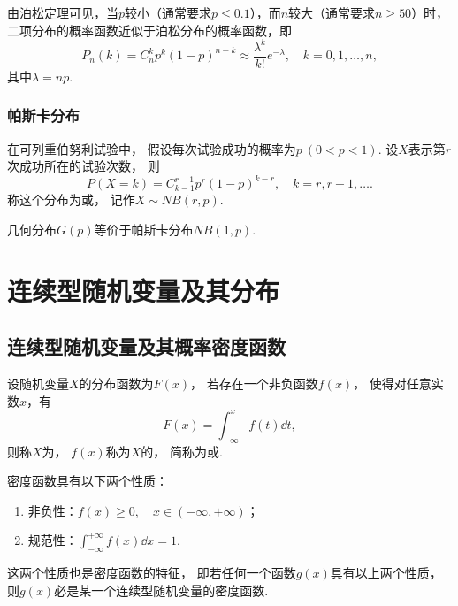 由泊松定理可见，当\(p\)较小（通常要求\(p \leq 0.1\)），而\(n\)较大（通常要求\(n \geq 50\)）时，
二项分布的概率函数近似于泊松分布的概率函数，即\[
	P_n(k) = C_n^k p^k (1-p)^{n-k}
	\approx \frac{\lambda^k}{k!} e^{-\lambda},
	\quad k=0,1,\dotsc,n,
\]
其中\(\lambda = n p\).

\subsubsection{帕斯卡分布}
\begin{definition}
在可列重伯努利试验中，
假设每次试验成功的概率为\(p\ (0<p<1)\).
设\(X\)表示第\(r\)次成功所在的试验次数，
则\begin{equation}
P(X=k) = C_{k-1}^{r-1} p^r (1-p)^{k-r},
\quad k=r,r+1,\dotsc.
\end{equation}
称这个分布为或，
记作\(X \sim NB(r, p)\).
\end{definition}

几何分布\(G(p)\)等价于帕斯卡分布\(NB(1,p)\).

\section{连续型随机变量及其分布}
\subsection{连续型随机变量及其概率密度函数}
\begin{definition}
设随机变量\(X\)的分布函数为\(F(x)\)，
若存在一个非负函数\(f(x)\)，
使得对任意实数\(x\)，有\[
	F(x) = \int_{-\infty}^x f(t) \dd{t},
\]
则称\(X\)为，
\(f(x)\)称为\(X\)的，
简称为或.
\end{definition}

\begin{property}\label{theorem:随机变量及其分布.连续型随机变量的密度函数的性质}
密度函数具有以下两个性质：
\begin{enumerate}
	\item 非负性：\(f(x) \geq 0, \quad x \in (-\infty,+\infty)\)；
	\item 规范性：\(\int_{-\infty}^{+\infty} f(x) \dd{x} = 1\).
\end{enumerate}
\end{property}
这两个性质也是密度函数的特征，
即若任何一个函数\(g(x)\)具有以上两个性质，
则\(g(x)\)必是某一个连续型随机变量的密度函数.

